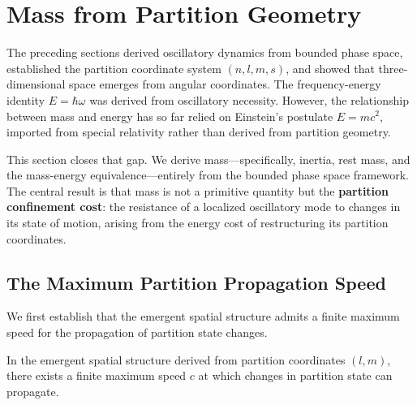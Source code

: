 \section{Mass from Partition Geometry}
\label{sec:mass-derivation}

The preceding sections derived oscillatory dynamics from bounded phase space, established the partition coordinate system $(n, l, m, s)$, and showed that three-dimensional space emerges from angular coordinates. The frequency-energy identity $E = \hbar\omega$ was derived from oscillatory necessity. However, the relationship between mass and energy has so far relied on Einstein's postulate $E = mc^2$, imported from special relativity rather than derived from partition geometry.

This section closes that gap. We derive mass---specifically, inertia, rest mass, and the mass-energy equivalence---entirely from the bounded phase space framework. The central result is that mass is not a primitive quantity but the \textbf{partition confinement cost}: the resistance of a localized oscillatory mode to changes in its state of motion, arising from the energy cost of restructuring its partition coordinates.

\subsection{The Maximum Partition Propagation Speed}

We first establish that the emergent spatial structure admits a finite maximum speed for the propagation of partition state changes.

\begin{theorem}
\label{thm:propagation-bound}
In the emergent spatial structure derived from partition coordinates $(l, m)$, there exists a finite maximum speed $c$ at which changes in partition state can propagate.
\end{theorem}

